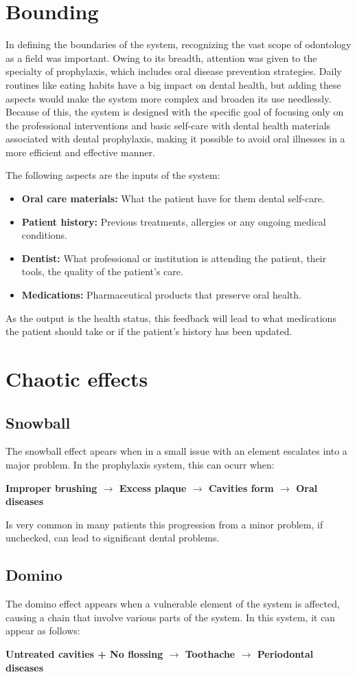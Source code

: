 \documentclass[12pt]{article}
\begin{document}
\section*{Bounding}
In defining the boundaries of the system, recognizing the vast scope of odontology as a field was important. Owing to its breadth, attention was given to the specialty of prophylaxis, which includes oral disease prevention strategies. Daily routines like eating habits have a big impact on dental health, but adding these aspects would make the system more complex and broaden its use needlessly. Because of this, the system is designed with the specific goal of focusing only on the professional interventions and basic self-care with dental health materials associated with dental prophylaxis, making it possible to avoid oral illnesses in a more efficient and effective manner.

The following aspects are the inputs of the system:
\begin{itemize}
    \item \textbf{Oral care materials: }What the patient have for them dental self-care.
    \item \textbf{Patient history: }Previous treatments, allergies or any ongoing medical conditions.
    \item \textbf{Dentist: }What professional or institution is attending the patient, their tools, the quality of the patient's care.
    \item \textbf{Medications: }Pharmaceutical products that preserve oral health.
\end{itemize}
As the output is the health status, this feedback will lead to what medications the patient should take or if the patient's history has been updated.

\section*{Chaotic effects}
\subsection*{Snowball}
The snowball effect apears when in a small issue with an element escalates into a major problem. In the prophylaxis system, this can ocurr when:

\textbf{Improper brushing $\rightarrow$ Excess plaque $\rightarrow$ Cavities form $\rightarrow$ Oral diseases}

Is very common in many patients this progression from a minor problem, if unchecked, can lead to significant dental problems.

\subsection*{Domino}
The domino effect appears when a vulnerable element of the system is affected, causing a chain that involve various parts of the system. In this system, it can appear as follows:

\textbf{Untreated cavities + No flossing $ \rightarrow $ Toothache $ \rightarrow $ Periodontal diseases}
\end{document}
